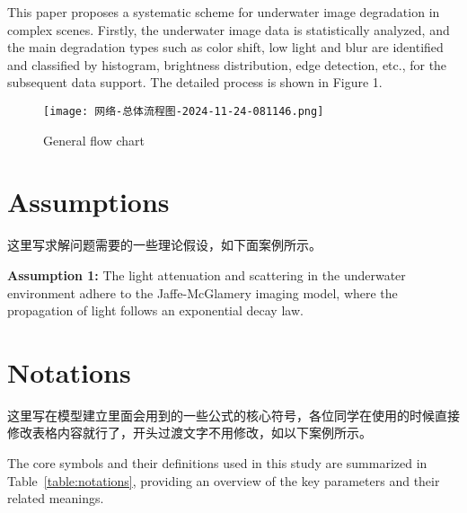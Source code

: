 \documentclass{apmcmthesis}                                             %
\begin{document}
This paper proposes a systematic scheme for underwater image degradation in complex scenes. Firstly, the underwater image data is statistically analyzed, and the main degradation types such as color shift, low light and blur are identified and classified by histogram, brightness distribution, edge detection, etc., for the subsequent data support. The detailed process is shown in Figure 1.
\begin{figure}[!th]
    \centering
    \texttt{[image: 网络-总体流程图-2024-11-24-081146.png]}
    \caption{General flow chart}
    \label{fig:enter-label}
\end{figure}












\newpage
\section{Assumptions}

这里写求解问题需要的一些理论假设，如下面案例所示。

\textbf{Assumption 1:} The light attenuation and scattering in the underwater environment adhere to the Jaffe-McGlamery imaging model, where the propagation of light follows an exponential decay law.





\section{Notations}
\setlength{\parindent}{2em} %

这里写在模型建立里面会用到的一些公式的核心符号，各位同学在使用的时候直接修改表格内容就行了，开头过渡文字不用修改，如以下案例所示。

The core symbols and their definitions used in this study are summarized in Table~\ref{table:notations}, providing an overview of the key parameters and their related meanings.
\end{document}
